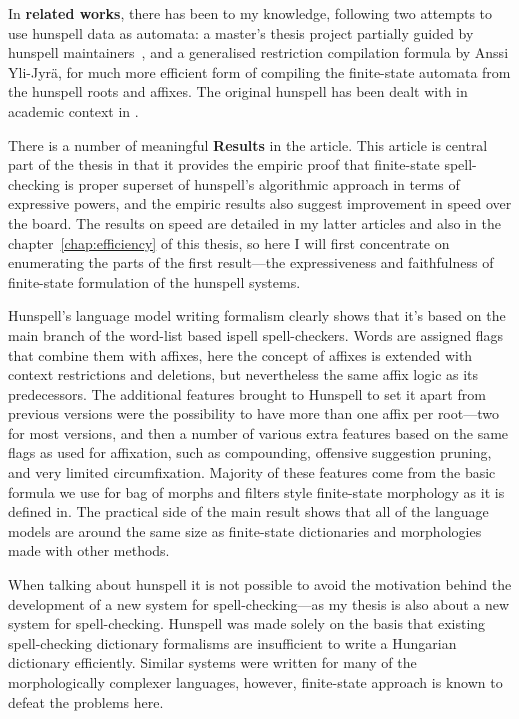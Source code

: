 \documentclass[officiallayout]{unihelcompling}
\begin{document}
In \textbf{related works}, there has been to my knowledge, following two
attempts to use hunspell data as automata: a master's thesis project partially
guided by hunspell maintainers~\citep{greenfield2010open}, and a generalised
restriction compilation formula by Anssi Yli-Jyrä, for much more efficient form
of compiling the finite-state automata from the hunspell roots and affixes. The
original hunspell has been dealt with in academic context in
\citep{tron2005hunmorph}.

There is a number of meaningful \textbf{Results} in the article. This article
is central part of the thesis in that it provides the empiric proof that
finite-state spell-checking is proper superset of hunspell's algorithmic 
approach in terms of expressive powers, and the empiric results also suggest
improvement in speed over the board. The results on speed are detailed in my
latter articles and also in the chapter~\ref{chap:efficiency} of this thesis,
so here I will first concentrate on enumerating the parts of the first
result---the expressiveness and faithfulness of finite-state formulation of
the hunspell systems.

Hunspell's language model writing formalism clearly shows that it's based on
the main branch of the word-list based ispell spell-checkers. Words are
assigned flags that combine them with affixes, here the concept of affixes is
extended with context restrictions and deletions, but nevertheless the same
affix logic as its predecessors. The additional features brought to Hunspell to
set it apart from previous versions were the possibility to have more than one
affix per root---two for most versions, and then a number of various extra
features based on the same flags as used for affixation, such as compounding,
offensive suggestion pruning, and very limited circumfixation.  Majority of
these features come from the basic formula we use for bag of morphs and filters
style finite-state morphology as it is defined in\citep{linden2009hfst}. The
practical side of the main result shows that all of the language models are
around the same size as finite-state dictionaries and morphologies made with
other methods.

When talking about hunspell it is not possible to avoid the motivation behind
the development of a new system for spell-checking---as my thesis is also about
a new system for spell-checking. Hunspell was made solely on the basis that
existing spell-checking dictionary formalisms are insufficient to write a
Hungarian dictionary efficiently. Similar systems were written for many of the
morphologically complexer languages, however, finite-state approach is known
to defeat the problems here.
\end{document}
